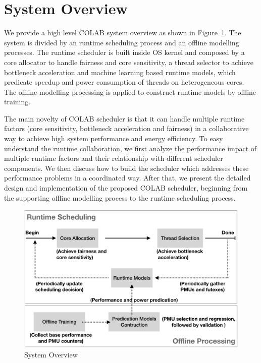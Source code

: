 \section{System Overview}
We provide a high level COLAB system overview as shown in Figure~\ref{figure:f1}. The system is divided by an runtime scheduling process and an offline modelling processes. The runtime scheduler is built inside OS kernel and composed by a core allocator to handle fairness and core sensitivity, a thread selector to achieve bottleneck acceleration and machine learning based runtime models, which predicate speedup and power consumption of threads on heterogeneous cores. The offline modelling processing is applied to construct runtime models by offline training. 

The main novelty of COLAB scheduler is that it can handle multiple runtime factors (core sensitivity, bottleneck acceleration and fairness) in a collaborative way to achieve high system performance and energy efficiency. To easy understand the runtime collaboration, we first analyze the performance impact of multiple runtime factors and their relationship with different scheduler components. We then discuss how to build the scheduler which addresses these performance problems in a coordinated way. After that, we present the detailed design and implementation of the proposed COLAB scheduler, beginning from the supporting offline modelling process to the runtime scheduling process. 

\begin{figure}
\centering
\includegraphics[scale=0.27]{figures/overview.png}
\caption{System Overview}
\label{figure:f1}
\end{figure} 


